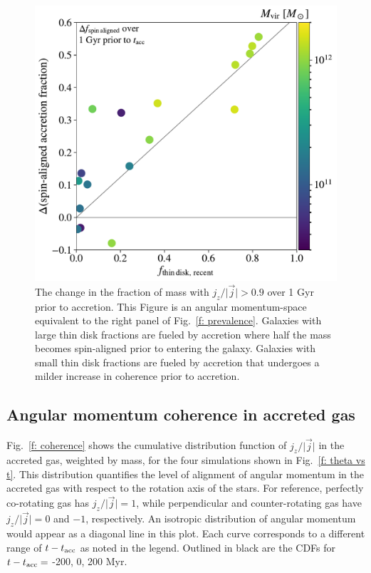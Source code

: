 \documentclass[fleqn,usenatbib]{mnras}
\newcommand{\tacc}{t_{\rm acc}}
\begin{document}
\begin{figure}
    \centering
    \includegraphics[width=\columnwidth]{figures/variations/relative_to_accretion/prevalence/delta_smooth_jdisk_frac_v_thin_disk_frac_recent.pdf}
    
    \caption{
    The change in the fraction of mass with $j_z/\vert \vec j \vert > 0.9$ over 1 Gyr prior to accretion.
    This Figure is an angular momentum-space equivalent to the right panel of Fig.~\ref{f: prevalence}.  
    Galaxies with large thin disk fractions are fueled by accretion where half the mass becomes spin-aligned prior to entering the galaxy.
    Galaxies with small thin disk fractions are fueled by accretion that undergoes a milder increase in coherence prior to accretion. 
    }
    \label{f: prevalence - angular momentum}
\end{figure}

\subsection{Angular momentum coherence in accreted gas}
\label{s: mechanics -- coherence}

Fig.~\ref{f: coherence} shows the cumulative distribution function of $j_z / \vert \vec j \vert$ in the accreted gas, weighted by mass, for the four simulations shown in Fig.~\ref{f: theta vs t}.
This distribution quantifies the level of alignment of angular momentum in the accreted gas with respect to the rotation axis of the stars.
For reference, perfectly co-rotating gas has $j_z / \vert \vec j \vert = 1$, while perpendicular and counter-rotating gas have $j_z / \vert \vec j \vert = 0$ and $-1$, respectively.
An isotropic distribution of angular momentum would appear as a diagonal line in this plot. 
Each curve corresponds to a different range of $t - \tacc$ as noted in the legend. 
Outlined in black are the CDFs for $t - \tacc =$ -200, 0, 200 Myr.
\end{document}
